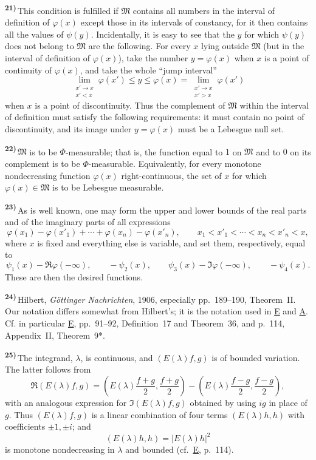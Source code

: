 \documentclass[12pt,b5paper,twoside]{article}
\newcommand{\originalnote}[1]{%
  \par\smallskip\noindent\hypertarget{note:#1}{\textsuperscript{\textbf{#1)}}}\,}
\begin{document}
\originalnote{21}This condition is fulfilled if $\mathfrak{M}$ contains all numbers
in the interval of definition of $\varphi(x)$ except those in its intervals of
constancy, for it then contains all the values of $\psi(y)$.  Incidentally, it is
easy to see that the $y$ for which $\psi(y)$ does not belong to $\mathfrak{M}$ are the
following.  For every $x$ lying outside $\mathfrak{M}$ (but in the interval of
definition of $\varphi(x)$), take the number $y=\varphi(x)$ when $x$ is a point of
continuity of $\varphi(x)$, and take the whole ``jump interval''
\[
 \lim_{\substack{x'\to x\\x'<x}}\varphi(x')
 \leq y\leq
 \varphi(x)
 =\lim_{\substack{x'\to x\\x'>x}}\varphi(x')
\]
when $x$ is a point of discontinuity.  Thus the complement of $\mathfrak{M}$ within
the interval of definition must satisfy the following requirements: it must contain
no point of discontinuity, and its image under $y=\varphi(x)$ must be a Lebesgue null
set.

\originalnote{22}$\mathfrak{M}$ is to be $\Phi$-measurable; that is, the function
equal to $1$ on $\mathfrak{M}$ and to $0$ on its complement is to be
$\Phi$-measurable.  Equivalently, for every monotone nondecreasing function
$\varphi(x)$ right-continuous, the set of $x$ for which
$\varphi(x)\in\mathfrak{M}$ is to be Lebesgue measurable.

\originalnote{23}As is well known, one may form the upper and lower bounds of the real
parts and of the imaginary parts of all expressions
\[
 \varphi(x_1)-\varphi(x'_1)+\cdots+
 \varphi(x_n)-\varphi(x'_n),
 \qquad
 x_1<x'_1<\cdots<x_n<x'_n<x,
\]
where $x$ is fixed and everything else is variable, and set them, respectively, equal
to
\[
 \psi_1(x)-\Re\varphi(-\infty),
 \qquad -\psi_2(x),
 \qquad \psi_3(x)-\Im\varphi(-\infty),
 \qquad -\psi_4(x).
\]
These are then the desired functions.

\originalnote{24}Hilbert, \emph{G\"ottinger Nachrichten}, 1906, especially
pp.~189--190, Theorem~II.  Our notation differs somewhat from Hilbert's; it is the
notation used in \hyperref[ref:E]{E} and \hyperref[ref:A]{A}.  Cf. in particular
\hyperref[ref:E]{E}, pp.~91--92, Definition~17 and
Theorem~36, and p.~114, Appendix~II, Theorem~9*.

\originalnote{25}The integrand, $\lambda$, is continuous, and
$(E(\lambda)f,g)$ is of bounded variation.  The latter follows from
\[
 \Re(E(\lambda)f,g)
 =\left(E(\lambda)\frac{f+g}{2},\frac{f+g}{2}\right)
  -\left(E(\lambda)\frac{f-g}{2},\frac{f-g}{2}\right),
\]
with an analogous expression for $\Im(E(\lambda)f,g)$ obtained by using $ig$ in
place of $g$.  Thus $(E(\lambda)f,g)$ is a linear combination of four terms
$(E(\lambda)h,h)$ with coefficients $\pm1,\pm i$; and
\[
 (E(\lambda)h,h)=| E(\lambda)h|^2
\]
is monotone nondecreasing in $\lambda$ and bounded (cf.\ \hyperref[ref:E]{E}, p.~114).
\end{document}
